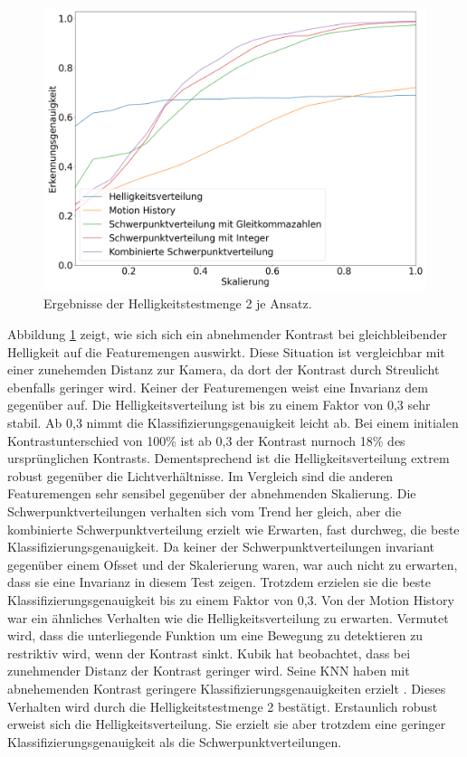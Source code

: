 \begin{figure}[h!]
    \centering
    \includegraphics[width=\linewidth]{images/brightness2_scaling.png}
    \caption{Ergebnisse der Helligkeitstestmenge 2 je Ansatz.}
    \label{fig:brightness2_scaling}
\end{figure}
\newline
\newline
Abbildung \ref{fig:brightness2_scaling} zeigt, wie sich sich ein abnehmender Kontrast bei gleichbleibender Helligkeit auf die Featuremengen auswirkt. Diese Situation ist vergleichbar mit einer zunehemden Distanz
zur Kamera, da dort der Kontrast durch Streulicht ebenfalls geringer wird. Keiner der Featuremengen weist eine Invarianz dem gegenüber auf. Die Helligkeitsverteilung ist bis zu einem Faktor von 0,3 sehr stabil. Ab 0,3
nimmt die Klassifizierungsgenauigkeit leicht ab. Bei einem initialen Kontrastunterschied von 100\% ist ab 0,3 der Kontrast nurnoch 18\% des ursprünglichen Kontrasts. Dementsprechend ist die Helligkeitsverteilung extrem
robust gegenüber die Lichtverhältnisse. Im Vergleich sind die anderen Featuremengen sehr sensibel gegenüber der abnehmenden Skalierung. Die Schwerpunktverteilungen verhalten sich vom Trend her gleich, aber die
kombinierte Schwerpunktverteilung erzielt wie Erwarten, fast durchweg, die beste Klassifizierungsgenauigkeit. Da keiner der Schwerpunktverteilungen invariant gegenüber einem Ofsset und der Skalerierung waren, war auch
nicht zu erwarten, dass sie eine Invarianz in diesem Test zeigen. Trotzdem erzielen sie die beste Klassifizierungsgenauigkeit bis zu einem Faktor von 0,3. Von der Motion History war ein ähnliches Verhalten wie die
Helligkeitsverteilung zu erwarten. Vermutet wird, dass die unterliegende Funktion um eine Bewegung zu detektieren zu restriktiv wird, wenn der Kontrast sinkt.
\newline
\newline
Kubik hat beobachtet, dass bei zunehmender Distanz der Kontrast geringer wird. Seine KNN haben mit abnehemenden Kontrast geringere Klassifizierungsgenauigkeiten erzielt \cite{kubikThesis}. Dieses Verhalten wird durch die
Helligkeitstestmenge 2 bestätigt. Erstaunlich robust erweist sich die Helligkeitsverteilung. Sie erzielt sie aber trotzdem eine geringer Klassifizierungsgenauigkeit als die Schwerpunktverteilungen.